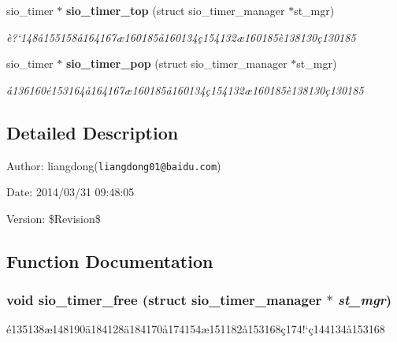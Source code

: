 \begin{CompactItemize}
sio\_\-timer $\ast$ {\bf sio\_\-timer\_\-top} (struct sio\_\-timer\_\-manager $\ast$st\_\-mgr)
\begin{CompactList}\small\item\em \`{e}?`148\aa{}155158\aa{}164167\ae{}160185\aa{}160134\c{c}154132\ae{}160185\`{e}138130\c{c}130185 \item\end{CompactList}\item 
sio\_\-timer $\ast$ {\bf sio\_\-timer\_\-pop} (struct sio\_\-timer\_\-manager $\ast$st\_\-mgr)
\begin{CompactList}\small\item\em \aa{}136160\'{e}153164\aa{}164167\ae{}160185\aa{}160134\c{c}154132\ae{}160185\`{e}138130\c{c}130185 \item\end{CompactList}\end{CompactItemize}


\subsection{Detailed Description}
\begin{Desc}
\item[Author:]liangdong({\tt liangdong01@baidu.com}) \end{Desc}
\begin{Desc}
\item[Date:]2014/03/31 09:48:05 \end{Desc}
\begin{Desc}
\item[Version:]\$Revision\$ \end{Desc}


\subsection{Function Documentation}
\subsubsection{\setlength{\rightskip}{0pt plus 5cm}void sio\_\-timer\_\-free (struct sio\_\-timer\_\-manager $\ast$ {\em st\_\-mgr})}\label{sio__timer_8h_a2}


\'{e}135138\ae{}148190\"{a}184128\"{a}184170\aa{}174154\ae{}151182\aa{}153168\c{c}174!`\c{c}144134\aa{}153168 

